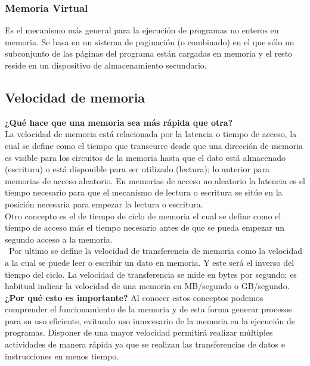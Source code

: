 \documentclass{article}
\begin{document}
\subsubsection{Memoria Virtual}
Es el mecanismo más general para la ejecución de programas no enteros en memoria. Se basa en un sistema de paginación (o combinado) en el que sólo un subconjunto de las páginas del programa están cargadas en memoria y el resto reside en un dispositivo de almacenamiento secundario.

\subsection{Velocidad de memoria}
\textbf{¿Qué hace que una memoria sea más rápida que otra?}\\
La velocidad de memoria está relacionada por la latencia o tiempo de acceso, la cual se define como el tiempo que transcurre desde que una dirección de memoria es visible para los circuitos de la memoria hasta que el dato está almacenado (escritura) o está disponible para ser utilizado (lectura); lo anterior para memorias de acceso aleatorio. En memorias de acceso no aleatorio la latencia es el tiempo necesario para que el mecanismo de lectura o escritura se sitúe en la posición necesaria para empezar la lectura o escritura.\cite{Estructura}\\
Otro concepto es el de tiempo de ciclo de memoria el cual se define como el tiempo de acceso más el tiempo necesario antes de que se pueda empezar un segundo acceso a la memoria.\\\
Por ultimo se define la velocidad de transferencia de memoria como la velocidad a la cual se puede leer o escribir un dato en memoria. Y este será el inverso del tiempo del ciclo. La velocidad de transferencia se mide en bytes por segundo; es habitual indicar la velocidad de una memoria en MB/segundo o GB/segundo.\\

\textbf{¿Por qué esto es importante?}
Al conocer estos conceptos podemos comprender el funcionamiento de la memoria y de esta forma generar procesos para su uso eficiente, evitando uso innecesario de la memoria en la ejecución de programas. Disponer de una mayor velocidad permitirá realizar múltiples actividades de manera rápida ya que se realizan las transferencias de datos e instrucciones en menos tiempo. 
\end{document}
